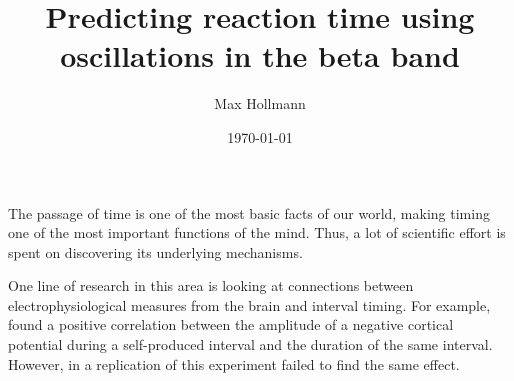 \documentclass[man,floatsintext]{apa6} %
\title{Predicting reaction time using oscillations in the beta band}
\author{Max Hollmann}
\affiliation{University of Groningen}
\date{\today}
\begin{document}
\maketitle

%



The passage of time is one of the most basic facts of our world,
making timing one of the most important functions of the mind.  Thus,
a lot of scientific effort is spent on discovering its underlying
mechanisms.

One line of research in this area is looking at connections between
electrophysiological measures from the brain and interval timing.  For
example,  found a positive correlation
between the amplitude of a negative cortical potential during a
self-produced interval and the duration of the same interval.
However, in a replication of this experiment
 failed to find the same effect.
\end{document}
